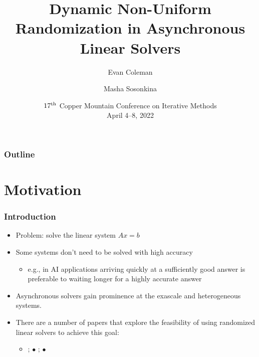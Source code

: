 \documentclass{beamer}
\title[Randomized Asynchronous Linear Solvers]{Dynamic Non-Uniform Randomization in Asynchronous Linear Solvers}
\author[Coleman \& Sosonkina]{Evan Coleman\inst{1} \and Masha Sosonkina\inst{2}}
\institute %
{
  \inst{1}%
  United States Department of Defense
   \and
  \inst{2}%
  Old Dominion University\\
}
\date{$17^{\rm th}$ Copper Mountain Conference on
Iterative Methods\\ April 4--8, 2022}
\begin{document}
%
\begin{frame}
	\titlepage
\end{frame}


\begin{frame}
	\frametitle{Outline}
	\tableofcontents
\end{frame}

\section{Motivation}

\begin{frame}
	\frametitle{Introduction}
	\begin{itemize}
		\item Problem: solve the linear system $Ax = b$
		\item Some systems don't need to be solved with high accuracy
		    \begin{itemize}
		        \item e.g., in AI applications arriving quickly at a sufficiently good answer is preferable to waiting longer for a highly accurate answer
		    \end{itemize}
		\item Asynchronous solvers gain prominence at the exascale and heterogeneous systems.
	    \item There are a number of papers that explore the feasibility of using randomized linear solvers to achieve this goal:
	        \begin{itemize}
	            \item \textcite{leventhal2010randomized}; 
	            $\bullet$ \textcite{griebel2012greedy};
	            $\bullet$ \textcite{avron2015revisiting}
	        \end{itemize}
	\end{itemize}	
\end{frame}

\end{document}
